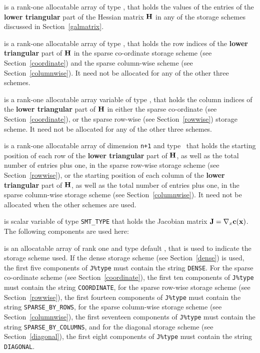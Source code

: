 \documentclass{galahad}
\begin{document}
\begin{description}
\begin{description}
 is a rank-one allocatable array of type \realdp, that holds
the values of the entries of the {\bf lower triangular} part
of the Hessian matrix ${\mathbf{H}}$ in any of the 
storage schemes discussed in Section~\ref{galmatrix}.

 is a rank-one allocatable array of type \integer,
that holds the row indices of the {\bf lower triangular} part of ${\mathbf{H}}$ 
in the sparse co-ordinate storage
scheme (see Section~\ref{coordinate}) and the sparse column-wise
scheme (see Section~\ref{columnwise}). 
It need not be allocated for any of the other three schemes.

 is a rank-one allocatable array variable of type \integer,
that holds the column indices of the {\bf lower triangular} part of 
${\mathbf{H}}$ in either the sparse co-ordinate 
(see Section~\ref{coordinate}), or the sparse row-wise 
(see Section~\ref{rowwise}) storage scheme.
It need not be allocated for any of the other three schemes.

 is a rank-one allocatable array of dimension {\tt n+1} and type 
\integer\ that holds the starting position of 
each row of the {\bf lower triangular} part of ${\mathbf{H}}$, as well
as the total number of entries plus one, in the sparse row-wise storage
scheme (see Section~\ref{rowwise}), or the starting position of 
each column of the {\bf lower triangular} part of ${\mathbf{H}}$, as well
as the total number of entries plus one, in the sparse column-wise storage
scheme (see Section~\ref{columnwise}).
It need not be allocated when the other schemes are used.

\end{description}

 is scalar variable of type {\tt SMT\_TYPE} 
that holds the Jacobian matrix ${\mathbf{J}}=\nabla_x{\mathbf{c}}({\mathbf{x}})$. The following components
are used here:

\begin{description}

 is an allocatable array of rank one and type default 
\character, that
is used to indicate the storage scheme used. If the dense storage scheme 
(see Section~\ref{dense}) is used, 
the first five components of {\tt J\%type} must contain the
string {\tt DENSE}.
For the sparse co-ordinate scheme (see Section~\ref{coordinate}), 
the first ten components of {\tt J\%type} must contain the
string {\tt COORDINATE},  
for the sparse row-wise storage scheme (see Section~\ref{rowwise}),
the first fourteen components of {\tt J\%type} must contain the
string {\tt SPARSE\_BY\_ROWS},
for the sparse column-wise storage scheme (see Section~\ref{columnwise}),
the first seventeen components of {\tt J\%type} must contain the
string {\tt SPARSE\_BY\_COLUMNS},
and for the diagonal storage scheme (see Section~\ref{diagonal}),
the first eight components of {\tt J\%type} must contain the
string {\tt DIAGONAL}.


\end{description}
\end{description}
\end{document}
